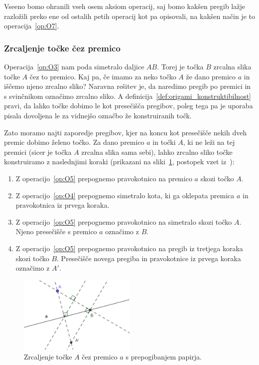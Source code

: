 Vseeno bomo ohranili vseh osem aksiom operacij, saj bomo kakšen pregib lažje razložili preko ene od ostalih petih operacij kot pa opisovali, na kakšen način je to operacija~\ref{op:O7}.

\subsubsection{Zrcaljenje točke čez premico}
\label{zrcaljenje_origami}

Operacija~\ref{op:O3} nam poda simetralo daljice $AB$. Torej je točka $B$ zrcalna slika točke $A$ čez to premico. Kaj pa, če imamo za neko točko $A$ že dano premico $a$ in iščemo njeno zrcalno sliko? Naravna rešitev je, da naredimo pregib po premici in s svinčnikom označimo zrcalno sliko. A definicija~\ref{def:origami_konstruktibilnost} pravi, da lahko točke dobimo le kot presečišča pregibov, poleg tega pa je uporaba pisala dovoljena le za vidnejšo označbo že konstruiranih točk.

Zato moramo najti zaporedje pregibov, kjer na koncu kot presečišče nekih dveh premic dobimo želeno točko. Za dano premico $a$ in točki $A$, ki ne leži na tej premici (sicer je točka $A$ zrcalna slika sama sebi), lahko zrcalno sliko točke konstruiramo z naslednjimi koraki (prikazani na sliki~\ref{fig:zrcaljenje_cez_premico}, postopek vzet iz~\cite[str.\ 28]{hull2020}):
\begin{enumerate}
    \item Z operacijo~\ref{op:O5} prepognemo pravokotnico na premico $a$ skozi točko $A$.
    \item Z operacijo~\ref{op:O4} prepognemo simetralo kota, ki ga oklepata premica $a$ in pravokotnica iz prvega koraka.
    \item Z operacijo~\ref{op:O5} prepognemo pravokotnico na simetralo skozi točko $A$. Njeno presečišče s premico $a$ označimo z $B$.
    \item Z operacijo~\ref{op:O5} prepognemo pravokotnico na pregib iz tretjega koraka skozi točko $B$. Presečišče novega pregiba in pravokotnice iz prvega koraka označimo z $A'$.
\end{enumerate}

\begin{figure}[h]
    \centering
    \includegraphics[width=0.5\textwidth]{images/zrcaljenje_tocke_cez_premico.png}
    \caption[Zrcaljenje čez premico]{Zrcaljenje točke $A$ čez premico $a$ s prepogibanjem papirja.}
    \label{fig:zrcaljenje_cez_premico}
\end{figure}

